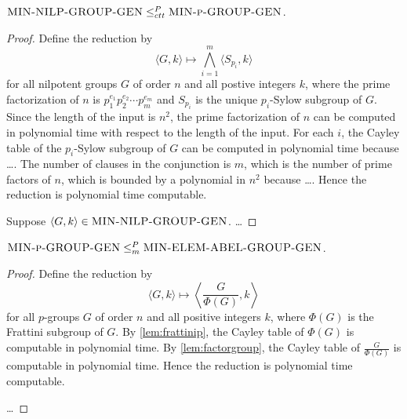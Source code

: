 \documentclass[]{article}
\begin{document}
\begin{proposition}
  $\textsc{MIN-NILP-GROUP-GEN} \leq_{ctt}^P \textsc{MIN-p-GROUP-GEN}$.
\end{proposition}
\begin{proof}
  Define the reduction by
  \begin{equation*}
    \langle G, k \rangle \mapsto \bigwedge_{i=1}^m \langle S_{p_i}, k \rangle
  \end{equation*}
  for all nilpotent groups $G$ of order $n$ and all postive integers $k$, where the prime factorization of $n$ is $p_1^{e_1}p_2^{e_2}\dotsb p_m^{e_m}$ and $S_{p_i}$ is the unique $p_i$-Sylow subgroup of $G$.
  Since the length of the input is $n^2$, the prime factorization of $n$ can be computed in polynomial time with respect to the length of the input.
  For each $i$, the Cayley table of the $p_i$-Sylow subgroup of $G$ can be computed in polynomial time because \ldots.
  The number of clauses in the conjunction is $m$, which is the number of prime factors of $n$, which is bounded by a polynomial in $n^2$ because \ldots.
  Hence the reduction is polynomial time computable.

  Suppose $\langle G, k \rangle \in \textsc{MIN-NILP-GROUP-GEN}$.
  \ldots
\end{proof}

\begin{proposition}
  $\textsc{MIN-p-GROUP-GEN} \leq_m^P \textsc{MIN-ELEM-ABEL-GROUP-GEN}$.
\end{proposition}
\begin{proof}
  Define the reduction by
  \begin{equation*}
    \langle G, k \rangle \mapsto \left\langle \frac{G}{\Phi(G)}, k \right\rangle
  \end{equation*}
  for all $p$-groups $G$ of order $n$ and all positive integers $k$, where $\Phi(G)$ is the Frattini subgroup of $G$.
  By \autoref{lem:frattinip}, the Cayley table of $\Phi(G)$ is computable in polynomial time.
  By \autoref{lem:factorgroup}, the Cayley table of $\frac{G}{\Phi(G)}$ is computable in polynomial time.
  Hence the reduction is polynomial time computable.

  \ldots
\end{proof}



\end{document}

